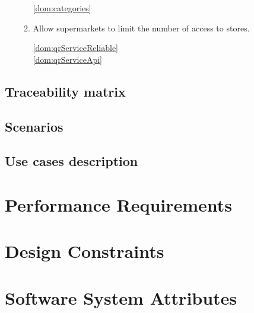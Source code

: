 \begin{enumerate}[label=\textbf{G.\arabic*}]
\begin{enumerate}[label*=\textbf{.\arabic*}]
            \ref{dom:categories}  ~\\


            \item Allow supermarkets to limit the number of access to stores.



            \ref{dom:qrServiceReliable}  ~\\
            \ref{dom:qrServiceApi}  ~\\
        \end{enumerate}
    \end{enumerate}

    \subsection{Traceability matrix}

    \subsection{Scenarios}

    \subsection{Use cases description}

\section{Performance Requirements}

\section{Design Constraints}

\section{Software System Attributes}

